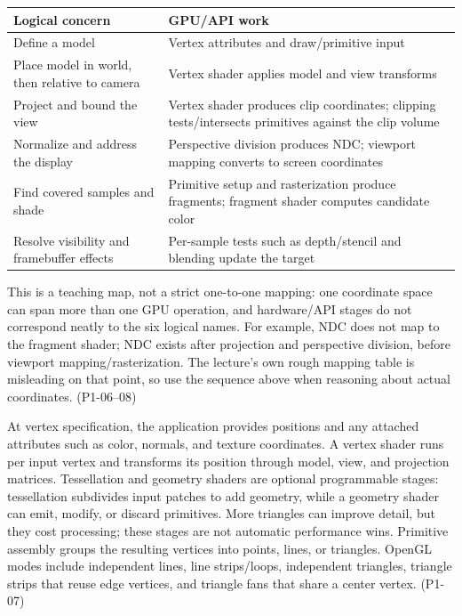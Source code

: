 {\def\LTcaptype{none} %
\begin{longtable}[]{@{}
  >{\raggedright\arraybackslash}p{}
  >{\raggedright\arraybackslash}p{}@{}}
\toprule\noalign{}
\begin{minipage}[b]{\linewidth}\raggedright
Logical concern
\end{minipage} & \begin{minipage}[b]{\linewidth}\raggedright
GPU/API work
\end{minipage} \\
\midrule\noalign{}
\endhead
\bottomrule\noalign{}
\endlastfoot
Define a model & Vertex attributes and draw/primitive input \\
Place model in world, then relative to camera & Vertex shader applies model and view transforms \\
Project and bound the view & Vertex shader produces clip coordinates; clipping tests/intersects primitives against the clip volume \\
Normalize and address the display & Perspective division produces NDC; viewport mapping converts to screen coordinates \\
Find covered samples and shade & Primitive setup and rasterization produce fragments; fragment shader computes candidate color \\
Resolve visibility and framebuffer effects & Per-sample tests such as depth/stencil and blending update the target \\
\end{longtable}
}

This is a teaching map, not a strict one-to-one mapping: one coordinate space can span more than one GPU operation, and hardware/API stages do not correspond neatly to the six logical names. For example, NDC does not map to the fragment shader; NDC exists after projection and perspective division, before viewport mapping/rasterization. The lecture's own rough mapping table is misleading on that point, so use the sequence above when reasoning about actual coordinates. (P1-06--08)

At vertex specification, the application provides positions and any attached attributes such as color, normals, and texture coordinates. A vertex shader runs per input vertex and transforms its position through model, view, and projection matrices. Tessellation and geometry shaders are optional programmable stages: tessellation subdivides input patches to add geometry, while a geometry shader can emit, modify, or discard primitives. More triangles can improve detail, but they cost processing; these stages are not automatic performance wins. Primitive assembly groups the resulting vertices into points, lines, or triangles. OpenGL modes include independent lines, line strips/loops, independent triangles, triangle strips that reuse edge vertices, and triangle fans that share a center vertex. (P1-07)

